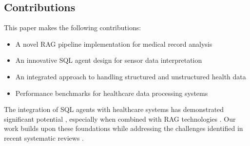 \subsection{Contributions}
This paper makes the following contributions:
\begin{itemize}
\item A novel RAG pipeline implementation for medical record analysis
\item An innovative SQL agent design for sensor data interpretation
\item An integrated approach to handling structured and unstructured health data
\item Performance benchmarks for healthcare data processing systems
\end{itemize}

The integration of SQL agents with healthcare systems has demonstrated significant potential \cite{troy2023}, especially when combined with RAG technologies \cite{omrani2024}. Our work builds upon these foundations while addressing the challenges identified in recent systematic reviews \cite{amugongo2024, bora2024}. 
